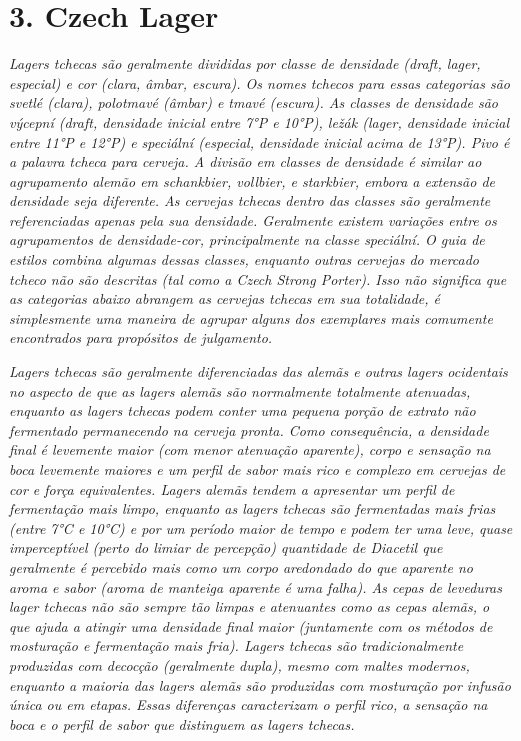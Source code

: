 \section*{3. Czech Lager}
\textit{Lagers tchecas são geralmente divididas por classe de densidade (draft, lager, especial) e cor (clara, âmbar, escura). Os nomes tchecos para essas categorias são svetlé (clara), polotmavé (âmbar) e tmavé (escura). As classes de densidade são výcepní (draft, densidade inicial entre 7°P e 10°P), ležák (lager, densidade inicial entre 11°P e 12°P) e speciální (especial, densidade inicial acima de 13°P). Pivo é a palavra tcheca para cerveja. A divisão em classes de densidade é similar ao agrupamento alemão em schankbier, vollbier, e starkbier, embora a extensão de densidade seja diferente. As cervejas tchecas dentro das classes são geralmente referenciadas apenas pela sua densidade. Geralmente existem variações entre os agrupamentos de densidade-cor, principalmente na classe speciální. O guia de estilos combina algumas dessas classes, enquanto outras cervejas do mercado tcheco não são descritas (tal como a Czech Strong Porter). Isso não significa que as categorias abaixo abrangem as cervejas tchecas em sua totalidade, é simplesmente uma maneira de agrupar alguns dos exemplares mais comumente encontrados para propósitos de julgamento.}

\textit{Lagers tchecas são geralmente diferenciadas das alemãs e outras lagers ocidentais no aspecto de que as lagers alemãs são normalmente totalmente atenuadas, enquanto as lagers tchecas podem conter uma pequena porção de extrato não fermentado permanecendo na cerveja pronta. Como consequência, a densidade final é levemente maior (com menor atenuação aparente), corpo e sensação na boca levemente maiores e um perfil de sabor mais rico e complexo em cervejas de cor e força equivalentes. Lagers alemãs tendem a apresentar um perfil de fermentação mais limpo, enquanto as lagers tchecas são fermentadas mais frias (entre 7°C e 10°C) e por um período maior de tempo e podem ter uma leve, quase imperceptível (perto do limiar de percepção) quantidade de Diacetil que geralmente é percebido mais como um corpo aredondado do que aparente no aroma e sabor (aroma de manteiga aparente é uma falha). As cepas de leveduras lager tchecas não são sempre tão limpas e atenuantes como as cepas alemãs, o que ajuda a atingir uma densidade final maior (juntamente com os métodos de mosturação e fermentação mais fria). Lagers tchecas são tradicionalmente produzidas com decocção (geralmente dupla), mesmo com maltes modernos, enquanto a maioria das lagers alemãs são produzidas com mosturação por infusão única ou em etapas. Essas diferenças caracterizam o perfil rico, a sensação na boca e o perfil de sabor que distinguem as lagers tchecas.}